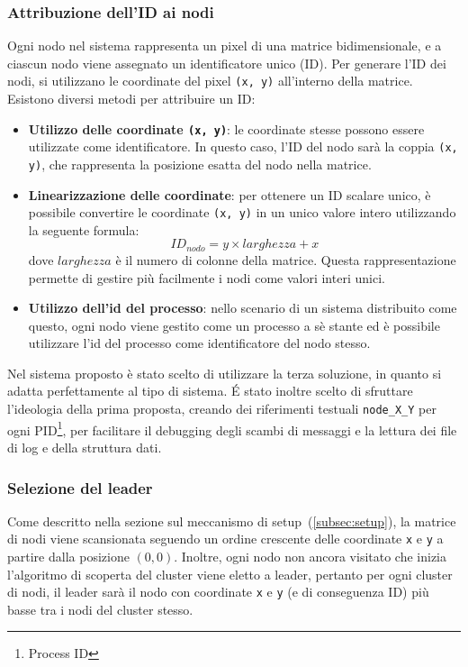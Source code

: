 \documentclass[12pt, a4paper]{report}
\begin{document}
\subsubsection{Attribuzione dell'ID ai nodi}

Ogni nodo nel sistema rappresenta un pixel di una matrice bidimensionale, e a ciascun nodo viene assegnato un identificatore unico (ID). Per generare l'ID dei nodi, si utilizzano le coordinate del pixel \texttt{(x, y)} all'interno della matrice. Esistono diversi metodi per attribuire un ID:

\begin{itemize}
    \item \textbf{Utilizzo delle coordinate \texttt{(x, y)}}: le coordinate stesse possono essere utilizzate come identificatore. In questo caso, l'ID del nodo sar\`a la coppia \texttt{(x, y)}, che rappresenta la posizione esatta del nodo nella matrice.
    
    \item \textbf{Linearizzazione delle coordinate}: per ottenere un ID scalare unico, \`e possibile convertire le coordinate \texttt{(x, y)} in un unico valore intero utilizzando la seguente formula:
    \[
    ID_{nodo} = y \times larghezza + x
    \]
    dove $larghezza$ \`e il numero di colonne della matrice. Questa rappresentazione permette di gestire pi\`u facilmente i nodi come valori interi unici.

    \item \textbf{Utilizzo dell'id del processo}: nello scenario di un sistema distribuito come questo, ogni nodo viene gestito come un processo a s\`e stante ed \`e possibile utilizzare l'id del processo come identificatore del nodo stesso.

\end{itemize}

Nel sistema proposto \`e stato scelto di utilizzare la terza soluzione, in quanto si adatta perfettamente al tipo di sistema. \'E stato inoltre scelto di sfruttare l'ideologia della prima proposta, creando dei riferimenti testuali \texttt{node\_X\_Y} per ogni PID\footnote{Process ID}, per facilitare il debugging degli scambi di messaggi e la lettura dei file di log e della struttura dati.

\subsubsection{Selezione del leader}

Come descritto nella sezione sul meccanismo di setup~(\ref{subsec:setup}), la matrice di nodi viene scansionata seguendo un ordine crescente delle coordinate \texttt{x} e \texttt{y} a partire dalla posizione $(0,0)$.
Inoltre, ogni nodo non ancora visitato che inizia l'algoritmo di scoperta del cluster viene eletto a leader, pertanto per ogni cluster di nodi, il leader sar\`a il nodo con coordinate \texttt{x} e \texttt{y} (e di conseguenza ID) pi\`u basse tra i nodi del cluster stesso.
\end{document}
